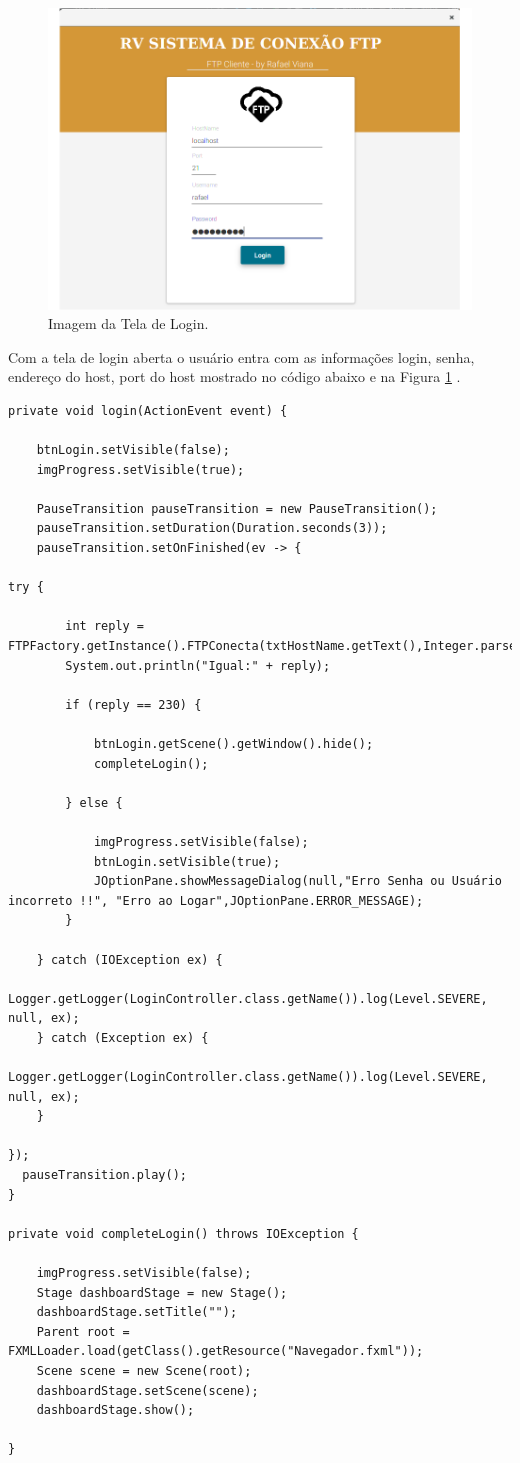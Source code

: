 \documentclass[12pt]{article}
\begin{document}
\begin{figure}[H]
	\centering
	\includegraphics[width=.9\textwidth]{Imagens/01.png}
	\caption{ Imagem da Tela de Login.}
	\label{fig:02}
\end{figure}

Com a tela de login aberta o usuário entra com as informações login, senha, endereço do host, port do host mostrado no código abaixo e na Figura \ref{fig:02} .
\vspace{.4cm}
\begin{lstlisting}
private void login(ActionEvent event) {

	btnLogin.setVisible(false);
	imgProgress.setVisible(true);
	
	PauseTransition pauseTransition = new PauseTransition();
	pauseTransition.setDuration(Duration.seconds(3));
	pauseTransition.setOnFinished(ev -> {

try {
	
		int reply = FTPFactory.getInstance().FTPConecta(txtHostName.getText(),Integer.parseInt(txtHostPort.getText()),this.txtUsername.getText(),this.txtPassword.getText());
		System.out.println("Igual:" + reply);
		
		if (reply == 230) {
		
			btnLogin.getScene().getWindow().hide();
			completeLogin();
		
		} else {
		
			imgProgress.setVisible(false);
			btnLogin.setVisible(true);
			JOptionPane.showMessageDialog(null,"Erro Senha ou Usuário incorreto !!", "Erro ao Logar",JOptionPane.ERROR_MESSAGE);
		}

	} catch (IOException ex) {
		Logger.getLogger(LoginController.class.getName()).log(Level.SEVERE, null, ex);
	} catch (Exception ex) {
		Logger.getLogger(LoginController.class.getName()).log(Level.SEVERE, null, ex);
	}

});
  pauseTransition.play();
}

private void completeLogin() throws IOException {
	
	imgProgress.setVisible(false);
	Stage dashboardStage = new Stage();
	dashboardStage.setTitle("");
	Parent root = FXMLLoader.load(getClass().getResource("Navegador.fxml"));
	Scene scene = new Scene(root);
	dashboardStage.setScene(scene);
	dashboardStage.show();
	
}

\end{lstlisting}
\end{document}
